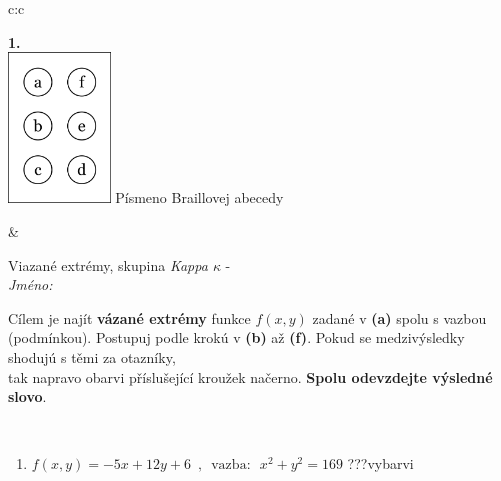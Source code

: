 \documentclass[10pt]{report}
\begin{document}
\begin{tabular}{c:c}
\begin{minipage}[c][104.5mm][t]{0.5\linewidth}
\begin{center}
\begin{minipage}{0.79\linewidth}
\begin{center}
\begin{varwidth}{\linewidth}
\begin{enumerate}
\end{enumerate}
\end{varwidth}
\end{center}
\end{minipage}
\begin{minipage}{0.20\linewidth}
\begin{center}
{\Huge\bfseries 1.} \\[2mm]
\includegraphics[height=40mm]{../images/braille.png}
{\small Písmeno Braillovej abecedy}
\end{center}
\end{minipage}
\end{center}
\end{minipage}
&
\begin{minipage}[c][104.5mm][t]{0.5\linewidth}
\begin{center}
\vspace{7mm}
{\huge Viazané extrémy, skupina \textit{Kappa $\kappa$} -}\\[5mm]
\textit{Jméno:}\phantom{xxxxxxxxxxxxxxxxxxxxxxxxxxxxxxxxxxxxxxxxxxxxxxxxxxxxxxxxxxxxxxxxx}\\[5mm]
\begin{minipage}{0.95\linewidth}
\begin{center}
Cílem je najít \textbf{vázané extrémy} funkce $f(x,y)$ zadané v \textbf{(a)} spolu s vazbou (podmínkou). Postupuj podle krokú v \textbf{(b)} až \textbf{(f)}. Pokud se medzivýsledky shodujú s těmi za otazníky,\\tak napravo obarvi příslušející kroužek načerno. \textbf{Spolu odevzdejte výsledné slovo}.
\end{center}
\end{minipage}
\\[1mm]
\begin{minipage}{0.79\linewidth}
\begin{center}
\begin{varwidth}{\linewidth}
\begin{enumerate}
\normalsize
\item $f(x,y)=-5x+12y+6 \enspace , \enspace \mathrm{vazba:} \enspace x^2+y^2=169$\quad \dotfill\; ???\;\dotfill \quad vybarvi

\end{enumerate}
\end{varwidth}
\end{center}
\end{minipage}
\end{center}
\end{minipage}
\end{tabular}
\end{document}
